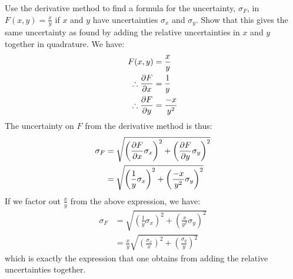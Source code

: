 \begin{example}{}{Use the derivative method to find a formula for the uncertainty, $\sigma_{F}$, in $F(x,y)=\frac{x}{y}$ if $x$ and $y$ have uncertainties $\sigma_{x}$ and $\sigma_{y}$. Show that this gives the same uncertainty as found by adding the relative uncertainties in $x$ and $y$ together in quadrature.}{}
We have:
\begin{align*}
F(x,y)&=\frac{x}{y}\\
\therefore \frac{\partial F}{\partial x}&=\frac{1}{y}\\
\therefore \frac{\partial F}{\partial y}&=\frac{-x}{y^2}
\end{align*}
The uncertainty on $F$ from the derivative method is thus:
\begin{align*}
\sigma_{F}&= \sqrt{\left(\frac{\partial F}{\partial x}\sigma_{x}\right)^2 + \left(\frac{\partial F}{\partial y} \sigma_{y}\right)^2}\\
  &= \sqrt{\left(\frac{1}{y}\sigma_{x}\right)^2 + \left(\frac{-x}{y^2} \sigma_{y}\right)^2}\\
\end{align*}
If we factor out $\frac{x}{y}$ from the above expression, we have:
\begin{align*}
\sigma_{F}&= \sqrt{\left(\frac{1}{y}\sigma_{x}\right)^2 + \left(\frac{x}{y^2} \sigma_{y}\right)^2}\\
&=\frac{x}{y}\sqrt{\left(\frac{\sigma_{x}}{x}\right)^2 + \left(\frac{\sigma_{y}}{y} \right)^2}
\end{align*}
which is exactly the expression that one obtains from adding the relative uncertainties together. 
\end{example}

